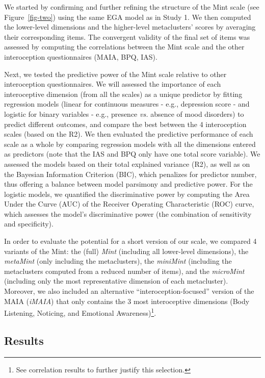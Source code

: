 \documentclass[
  jou,
  floatsintext,
  longtable,
  nolmodern,
  notxfonts,
  notimes,
  colorlinks=true,linkcolor=blue,citecolor=blue,urlcolor=blue]{apa7}
\begin{document}
We started by confirming and further refining the structure of the Mint
scale (see Figure~\ref{fig-two}) using the same EGA model as in Study 1.
We then computed the lower-level dimensions and the higher-level
metaclusters' scores by averaging their corresponding items. The
convergent validity of the final set of items was assessed by computing
the correlations between the Mint scale and the other interoception
questionnaires (MAIA, BPQ, IAS).

Next, we tested the predictive power of the Mint scale relative to other
interoception questionnaires. We will assessed the importance of each
interoceptive dimension (from all the scales) as a unique predictor by
fitting regression models (linear for continuous measures - e.g.,
depression score - and logistic for binary variables - e.g., presence
\emph{vs.} absence of mood disorders) to predict different outcomes, and
compare the best between the 4 interoception scales (based on the R2).
We then evaluated the predictive performance of each scale as a whole by
comparing regression models with all the dimensions entered as
predictors (note that the IAS and BPQ only have one total score
variable). We assessed the models based on their total explained
variance (R2), as well as on the Bayesian Information Criterion (BIC),
which penalizes for predictor number, thus offering a balance between
model parsimony and predictive power. For the logistic models, we
quantified the discriminative power by computing the Area Under the
Curve (AUC) of the Receiver Operating Characteristic (ROC) curve, which
assesses the model's discriminative power (the combination of
sensitivity and specificity).

In order to evaluate the potential for a short version of our scale, we
compared 4 variants of the Mint: the (full) \emph{Mint} (including all
lower-level dimensions), the \emph{metaMint} (only including the
metaclusters), the \emph{miniMint} (including the metaclusters computed
from a reduced number of items), and the \emph{microMint} (including
only the most representative dimension of each metacluster). Moreover,
we also included an alternative ``interoception-focused'' version of the
MAIA (\emph{iMAIA}) that only contains the 3 most interoceptive
dimensions (Body Listening, Noticing, and Emotional
Awareness)\footnote{See correlation results to further justify this
  selection.}.

\subsection{Results}\label{results-1}
\end{document}
